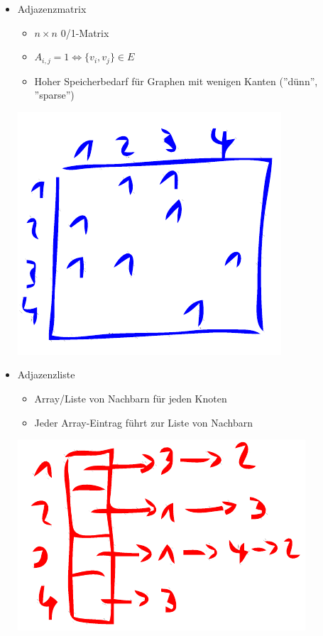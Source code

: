 \documentclass{scrartcl}
\begin{document}
\begin{itemize}
	\item Adjazenzmatrix
	\begin{itemize}
		\item $ n \times n $ 0/1-Matrix
		\item $ A_{i,j} = 1 \iff \{ v_i,v_j \} \in E $
		\item Hoher Speicherbedarf für Graphen mit wenigen Kanten (''dünn'', ''sparse'')
	\end{itemize}
	\includegraphics{figures/adjazenz-matrix.pdf}
	\item Adjazenzliste
	\begin{itemize}
		\item Array/Liste von Nachbarn für jeden Knoten
		\item Jeder Array-Eintrag führt zur Liste von Nachbarn
	\end{itemize}
	\includegraphics{figures/adjazenz-liste.pdf}
\end{itemize}
\end{document}
